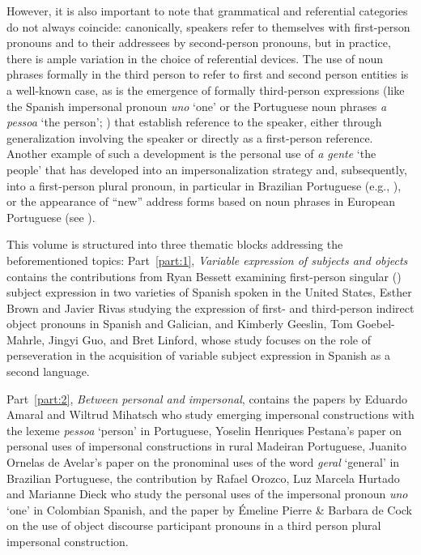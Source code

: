 \documentclass[output=paper]{langscibook}
\begin{document}
However, it is also important to note that grammatical and referential categories do not always coincide: canonically, speakers refer to themselves with first-person pronouns and to their addressees by second-person pronouns, but in practice, there is ample variation in the choice of referential devices. The use of noun phrases formally in the third person to refer to first and second person entities is a well-known case, as is the emergence of formally third-person expressions (like the Spanish impersonal pronoun \textit{uno} ‘one’ or the Portuguese noun phrases \textit{a pessoa}  ‘the person’; ) that establish reference to the speaker, either through generalization involving the speaker or directly as a first-person reference. Another example of such a development is the personal use of \textit{a gente}  ‘the people’ that has developed into an impersonalization strategy and, subsequently, into a first-person plural pronoun, in particular in Brazilian Portuguese (e.g., \citealt{Lopes2004, Zilles2005}), or the appearance of “new” address forms based on noun phrases in European Portuguese (see ).\largerpage



This volume is structured into three thematic blocks addressing the beforementioned topics: Part~\ref{part:1}, \textit{Variable expression of subjects and objects} contains the contributions from Ryan Bessett examining first-person singular () subject expression in two varieties of Spanish spoken in the United States, Esther Brown and Javier Rivas studying the expression of first- and third-person indirect object pronouns in Spanish and Galician, and Kimberly Geeslin, Tom Goebel-Mahrle, Jingyi Guo, and Bret Linford, whose study focuses on the role of perseveration in the acquisition of variable subject expression in Spanish as a second language. 



Part~\ref{part:2}, \textit{Between personal and impersonal},  contains the papers by Eduardo Amaral and Wiltrud Mihatsch who study emerging impersonal constructions with the lexeme \textit{pessoa}  ‘person’ in Portuguese, Yoselin Henriques Pestana's paper on personal uses of impersonal constructions in rural Madeiran Portuguese, Juanito Ornelas de Avelar’s paper on the pronominal uses of the word \textit{geral}  ‘general’ in Brazilian Portuguese, the contribution by Rafael Orozco, Luz Marcela Hurtado and Marianne Dieck who study the personal uses of the impersonal pronoun \textit{uno}  ‘one’ in Colombian Spanish, and the paper by Émeline Pierre \& Barbara de Cock on the use of object discourse participant pronouns in a third person plural impersonal construction. 
\end{document}
